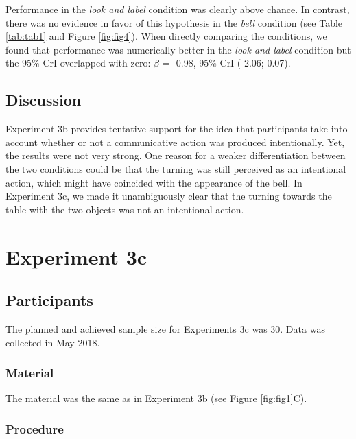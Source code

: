 \documentclass[
  man,floatsintext]{apa6}
\begin{document}
Performance in the \emph{look and label} condition was clearly above chance. In contrast, there was no evidence in favor of this hypothesis in the \emph{bell} condition (see Table \ref{tab:tab1} and Figure \ref{fig:fig4}). When directly comparing the conditions, we found that performance was numerically better in the \emph{look and label} condition but the 95\% CrI overlapped with zero: \(\beta\) = -0.98, 95\% CrI (-2.06; 0.07).

\subsection{Discussion}\label{discussion-4}

Experiment 3b provides tentative support for the idea that participants take into account whether or not a communicative action was produced intentionally. Yet, the results were not very strong. One reason for a weaker differentiation between the two conditions could be that the turning was still perceived as an intentional action, which might have coincided with the appearance of the bell. In Experiment 3c, we made it unambiguously clear that the turning towards the table with the two objects was not an intentional action.

\section{Experiment 3c}\label{experiment-3c}

\subsection{Participants}\label{participants-5}

The planned and achieved sample size for Experiments 3c was 30. Data was collected in May 2018.

\subsubsection{Material}\label{material-5}

The material was the same as in Experiment 3b (see Figure \ref{fig:fig1}C).

\subsubsection{Procedure}\label{procedure-5}
\end{document}
